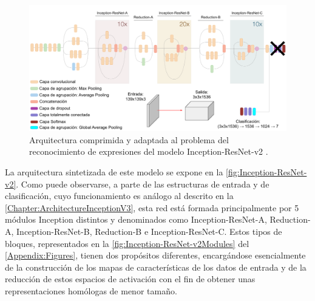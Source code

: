 \begin{figure}
    \centering
    \includegraphics[width=\textwidth]{Images/Inception-ResNet-v2.png}
    \caption{Arquitectura comprimida y adaptada al problema del reconocimiento de expresiones del modelo Inception-ResNet-v2 \cite{img:Inception-ResNet-v2}.}
    \label{fig:Inception-ResNet-v2}
\end{figure}

La arquitectura sintetizada de este modelo se expone en la \autoref{fig:Inception-ResNet-v2}. Como puede observarse, a parte de las estructuras de entrada y de clasificación, cuyo funcionamiento es análogo al descrito en la \autoref{Chapter:ArchitectureInceptionV3}, esta red está formada principalmente por 5 módulos Inception distintos y denominados como Inception-ResNet-A, Reduction-A, Inception-ResNet-B, Reduction-B e Inception-ResNet-C. Estos tipos de bloques, representados en la \autoref{fig:Inception-ResNet-v2Modules} del \autoref{Appendix:Figures}, tienen dos propósitos diferentes, encargándose esencialmente de la construcción de los mapas de características de los datos de entrada y de la reducción de estos espacios de activación con el fin de obtener unas representaciones homólogas de menor tamaño. 

